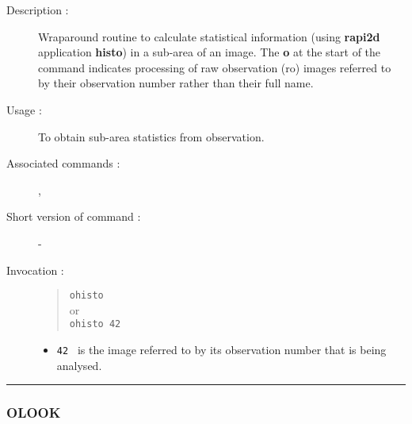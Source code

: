\begin{description}

\item[Description :] Wraparound routine to calculate statistical
information (using {\bf rapi2d} application {\bf histo}) in a sub-area of an
image. The {\bf o} at the start of the command indicates processing of raw
observation ({\sc ro}) images referred to by their observation number
rather than their full name.

\item[Usage :] To obtain sub-area statistics from observation.
\item[Associated commands :] {\tt {}}, 
{\tt {}}
\item[Short version of command :] -
\item[Invocation :]

\begin{quote}{\tt  ohisto }\\
or \\
{\tt ohisto 42 }
\end{quote}

\begin{itemize}

\item {\tt 42 } is the image referred to by its observation number that
  is being analysed.
\end{itemize}

\end{description}

\hrule 
\subsubsection*{\label{OLOOK}OLOOK}

